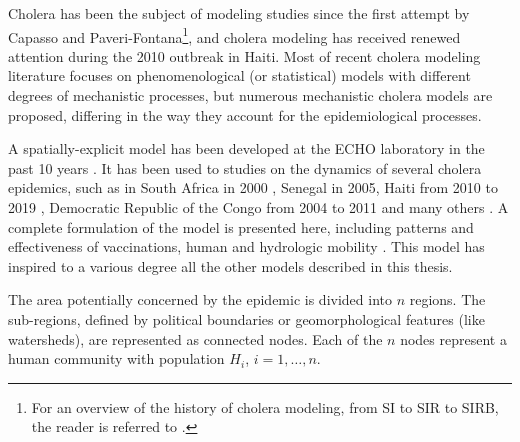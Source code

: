 Cholera has been the subject of modeling studies since the first attempt by Capasso and Paveri-Fontana\cite[-4\baselineskip]{Capasso:MathematicalModel1973:1979}\footnote[][-1\baselineskip]{For an overview of the history of cholera modeling, from SI to SIR to SIRB, the reader is referred to .}, and cholera modeling has received renewed attention during the 2010 outbreak in Haiti. Most of recent cholera modeling literature focuses on phenomenological (or statistical) models with different degrees of mechanistic processes, but numerous mechanistic cholera models are proposed, differing in the way they account for the epidemiological processes. %


A spatially-explicit model has been developed at the ECHO laboratory in the past 10 years \parencite{Bertuzzo:SpacetimeEvolutionCholera:2008}. It has been used to studies on the dynamics of several cholera epidemics, such as in South Africa in 2000 \parencite{Mari:ModellingCholeraEpidemics:2012}, Senegal in 2005, Haiti from 2010 to 2019 \parencite{Bertuzzo:PredictionSpatialEvolution:2011,Bertuzzo:ProbabilityExtinctionHaiti:2016}, Democratic Republic of the Congo from 2004 to 2011 and many others \parencite{Finger:PotentialImpactCasearea:2018}.  
A complete formulation of the model is presented here, including patterns and effectiveness of vaccinations, human and hydrologic mobility \parencite{Bertuzzo:ProbabilityExtinctionHaiti:2016,Pasetto:RealtimeForecastingCholera:2018}. This model has inspired to a various degree all the other models described in this thesis.

The area potentially concerned by the epidemic is divided into $n$ regions. The sub-regions, defined by political boundaries or geomorphological features (like watersheds\cite{Bertuzzo:ProbabilityExtinctionHaiti:2016}), are represented as connected nodes. Each of the $n$ nodes represent a human community with population $H_i$, $i=1,\dots, n$. 


